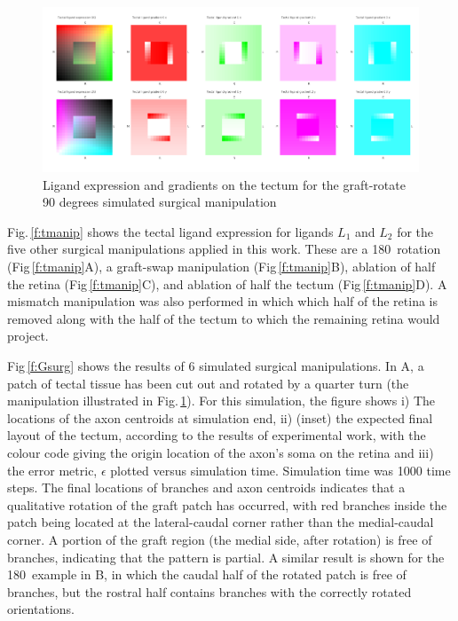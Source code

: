 \documentclass[11pt, a4paper, draft]{article}
\begin{document}
%
\begin{figure}
\includegraphics[width=\linewidth]{./images/Tissuevisb.png}
\caption{Ligand expression and gradients on the tectum for the
graft-rotate 90 degrees simulated surgical manipulation}
\label{f:trot90}
\end{figure}

Fig.\,\ref{f:tmanip} shows the tectal ligand expression for ligands $L_1$ and
$L_2$ for the five other surgical manipulations applied in this work. These
are a 180\degree~rotation (Fig\,\ref{f:tmanip}A), a graft-swap manipulation
(Fig\,\ref{f:tmanip}B), ablation of half the retina (Fig\,\ref{f:tmanip}C),
and ablation of half the tectum (Fig\,\ref{f:tmanip}D). A mismatch
manipulation was also performed in which which half of the retina is removed
along with the half of the tectum to which the remaining retina would project.

Fig\,\ref{f:Gsurg} shows the results of 6 simulated surgical
manipulations. In A, a patch of tectal tissue has been cut out and rotated by
a quarter turn (the manipulation illustrated in Fig.\,\ref{f:trot90}). For
this simulation, the figure shows i) The locations of the axon centroids at
simulation end, ii) (inset) the expected final layout of the tectum, according
to the results of experimental work, with the colour code giving the origin
location of the axon's soma on the retina and iii) the error metric,
$\epsilon$ plotted versus simulation time. Simulation time was 1000 time
steps. The final locations of branches and axon centroids indicates that a
qualitative rotation of the graft patch has occurred, with red branches inside
the patch being located at the lateral-caudal corner rather than the
medial-caudal corner. A portion of the graft region (the medial side, after
rotation) is free of branches, indicating that the pattern is partial. A
similar result is shown for the 180\degree~example in B, in which the caudal
half of the rotated patch is free of branches, but the rostral half contains
branches with the correctly rotated orientations.
\end{document}
